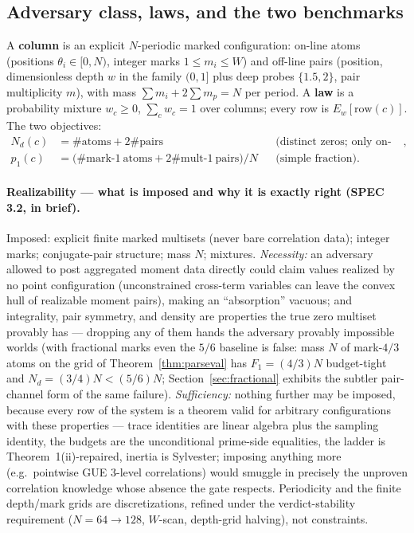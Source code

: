 \documentclass[11pt]{article}
\theoremstyle{plain}
\theoremstyle{definition}
\theoremstyle{remark}
\newcommand{\Nd}{N_{d}}
\begin{document}
\subsection{Adversary class, laws, and the two benchmarks}
\label{sec:adversary}

A \textbf{column} is an explicit $N$-periodic marked configuration: on-line atoms
(positions $\theta_i \in [0, N)$, integer marks $1 \le m_i \le W$) and off-line
pairs (position, dimensionless depth $w$ in the family $(0, 1]$ plus deep probes
$\{1.5, 2\}$, pair multiplicity $m$), with mass
$\sum m_i + 2 \sum m_p = N$ per period. A \textbf{law} is a probability mixture
$w_c \ge 0$, $\sum_c w_c = 1$ over columns; every row is $E_w[\mathrm{row}(c)]$.
The two objectives:
\begin{align*}
  \Nd(c) &= \#\mathrm{atoms} + 2\#\mathrm{pairs}
    && \text{(distinct zeros; only on-line multiples reduce it)},\\
  p_1(c) &= \bigl( \#\text{mark-}1\ \mathrm{atoms}
      + 2\#\text{mult-}1\ \mathrm{pairs} \bigr)/N
    && \text{(simple fraction)}.
\end{align*}

\paragraph{Realizability --- what is imposed and why it is exactly right (SPEC
3.2, in brief).}
Imposed: explicit finite marked multisets (never bare correlation data); integer
marks; conjugate-pair structure; mass $N$; mixtures. \emph{Necessity:} an
adversary allowed to post aggregated moment data directly could claim values
realized by no point configuration (unconstrained cross-term variables can leave
the convex hull of realizable moment pairs), making an ``absorption'' vacuous;
and integrality, pair symmetry, and density are properties the true zero multiset
provably has --- dropping any of them hands the adversary provably impossible
worlds (with fractional marks even the $5/6$ baseline is false: mass $N$ of
mark-$4/3$ atoms on the grid of Theorem~\ref{thm:parseval} has
$F_1 = (4/3) N$ budget-tight and $\Nd = (3/4) N < (5/6) N$;
Section~\ref{sec:fractional} exhibits the subtler pair-channel form of the same
failure). \emph{Sufficiency:} nothing further may be imposed, because every row of
the system is a theorem valid for arbitrary configurations with these properties
--- trace identities are linear algebra plus the sampling identity, the budgets
are the unconditional prime-side equalities, the ladder is Theorem~1(ii)-repaired,
inertia is Sylvester; imposing anything more (e.g.\ pointwise GUE $3$-level
correlations) would smuggle in precisely the unproven correlation knowledge whose
absence the gate respects. Periodicity and the finite depth/mark grids are
discretizations, refined under the verdict-stability requirement
($N = 64 \to 128$, $W$-scan, depth-grid halving), not constraints.
\end{document}
